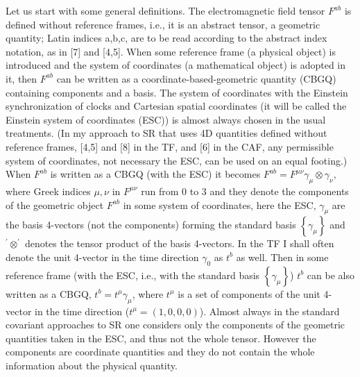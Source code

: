 \documentclass[a4paper,showpacs,preprintnumbers,amsmath,amssymb]{revtex4}
\begin{document}
Let us start with some general definitions. The electromagnetic field tensor
$F^{ab}$ is defined without reference frames, i.e., it is an abstract
tensor, a geometric quantity; Latin indices a,b,c, are to be read according
to the abstract index notation, as in [7] and [4,5]. When some reference
frame (a physical object) is introduced and the system of coordinates (a
mathematical object) is adopted in it, then $F^{ab}$ can be written as a
coordinate-based-geometric quantity (CBGQ) containing components and a
basis. The system of coordinates with the Einstein synchronization of clocks
and Cartesian spatial coordinates (it will be called the Einstein system of
coordinates (ESC)) is almost always chosen in the usual treatments. (In my
approach to SR that uses 4D quantities defined without reference frames,
[4,5] and [8] in the TF, and [6] in the CAF, any permissible system of
coordinates, not necessary the ESC, can be used on an equal footing.) When $%
F^{ab}$ is written as a CBGQ (with the ESC) it becomes $F^{ab}=F^{\mu \nu
}\gamma _{\mu }\otimes \gamma _{\nu },$ where Greek indices $\mu ,\nu $ in $%
F^{\mu \nu }$ run from 0 to 3 and they denote the components of the
geometric object $F^{ab}$ in some system of coordinates, here the ESC, $%
\gamma _{\mu }$ are the basis 4-vectors (not the components) forming the
standard basis $\left\{ \gamma _{\mu }\right\} $ and $^{\prime }\otimes
^{\prime }$ denotes the tensor product of the basis 4-vectors. In the TF I
shall often denote the unit 4-vector in the time direction $\gamma _{0}$ as $%
t^{b}$ as well. Then in some reference frame (with the ESC, i.e., with the
standard basis $\left\{ \gamma _{\mu }\right\} $) $t^{b}$ can be also
written as a CBGQ, $t^{b}=t^{\mu }\gamma _{\mu }$, where $t^{\mu }$ is a set
of components of the unit 4-vector in the time direction ($t^{\mu }=\left(
1,0,0,0\right) $). Almost always in the standard covariant approaches to SR
one considers only the components of the geometric quantities taken in the
ESC, and thus not the whole tensor. However the components are coordinate
quantities and they do not contain the whole information about the physical
quantity.
\end{document}
